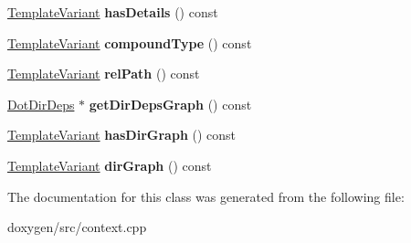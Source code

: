 \begin{DoxyCompactItemize}
\item 
\mbox{\label{class_dir_context_1_1_private_a2039fb5ff7ea06c9a6abca231fcc5ef6}} 
\mbox{\hyperlink{class_template_variant}{Template\+Variant}} {\bfseries has\+Details} () const
\item 
\mbox{\label{class_dir_context_1_1_private_a779d51b6872807417b61b403301e21fc}} 
\mbox{\hyperlink{class_template_variant}{Template\+Variant}} {\bfseries compound\+Type} () const
\item 
\mbox{\label{class_dir_context_1_1_private_a8c5a38bdd24e1bdb0c5dad61943381f7}} 
\mbox{\hyperlink{class_template_variant}{Template\+Variant}} {\bfseries rel\+Path} () const
\item 
\mbox{\label{class_dir_context_1_1_private_a24206dacc182b0f8996b5fbd50e0013d}} 
\mbox{\hyperlink{class_dot_dir_deps}{Dot\+Dir\+Deps}} $\ast$ {\bfseries get\+Dir\+Deps\+Graph} () const
\item 
\mbox{\label{class_dir_context_1_1_private_a4c83408074ea20addcbd299ef7b584e8}} 
\mbox{\hyperlink{class_template_variant}{Template\+Variant}} {\bfseries has\+Dir\+Graph} () const
\item 
\mbox{\label{class_dir_context_1_1_private_a8a826e4960e9a943c6681e4873ac594c}} 
\mbox{\hyperlink{class_template_variant}{Template\+Variant}} {\bfseries dir\+Graph} () const
\end{DoxyCompactItemize}


The documentation for this class was generated from the following file\+:\begin{DoxyCompactItemize}
\item 
doxygen/src/context.\+cpp\end{DoxyCompactItemize}

